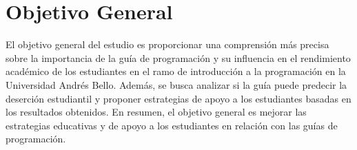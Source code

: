 \hypertarget{objetivo_general}{%
    \section{Objetivo General}\label{Objetivo General}}

    El objetivo general del estudio es proporcionar una comprensión más 
    precisa sobre la importancia de la guía de programación y su influencia 
    en el rendimiento académico de los estudiantes en el ramo de introducción 
    a la programación en la Universidad Andrés Bello. Además, se busca 
    analizar si la guía puede predecir la deserción estudiantil y proponer 
    estrategias de apoyo a los estudiantes basadas en los resultados obtenidos. 
    En resumen, el objetivo general es mejorar las estrategias educativas y de
    apoyo a los estudiantes en relación con las guías de programación.